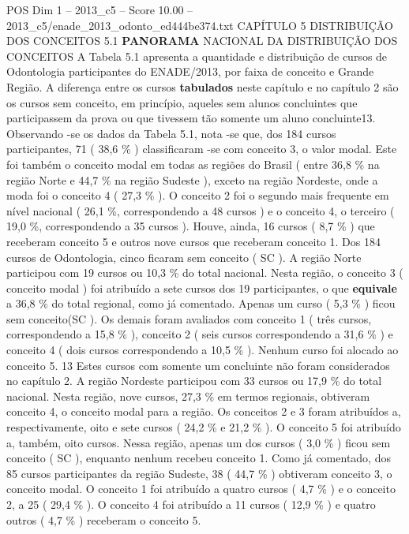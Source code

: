 \begin{textsample}{POS Dim 1 – 2013\_c5 – Score 10.00 – 2013\_c5/enade\_2013\_odonto\_ed444be374.txt}  \label{ex:f1_pos_083}
CAPÍTULO 5 DISTRIBUIÇÃO DOS CONCEITOS 5.1 \textbf{PANORAMA} NACIONAL DA DISTRIBUIÇÃO DOS CONCEITOS A Tabela 5.1 apresenta a quantidade e distribuição de cursos de Odontologia participantes do ENADE/2013, por faixa de conceito e Grande Região.
A diferença entre os cursos \textbf{tabulados} neste capítulo e no capítulo 2 são os cursos sem conceito, em princípio, aqueles sem alunos concluintes que participassem da prova ou que tivessem tão somente um aluno concluinte13.
Observando -se os dados da Tabela 5.1, nota -se que, dos 184 cursos participantes, 71 ( 38,6 \% ) classificaram -se com conceito 3, o valor modal.
Este foi também o conceito modal em todas as regiões do Brasil ( entre 36,8 \% na região Norte e 44,7 \% na região Sudeste ), exceto na região Nordeste, onde a moda foi o conceito 4 ( 27,3 \% ).
O conceito 2 foi o segundo mais frequente em nível nacional ( 26,1 \%, correspondendo a 48 cursos ) e o conceito 4, o terceiro ( 19,0 \%, correspondendo a 35 cursos ).
Houve, ainda, 16 cursos ( 8,7 \% ) que receberam conceito 5 e outros nove cursos que receberam conceito 1.
Dos 184 cursos de Odontologia, cinco ficaram sem conceito ( SC ).
A região Norte participou com 19 cursos ou 10,3 \% do total nacional.
Nesta região, o conceito 3 ( conceito modal ) foi atribuído a sete cursos dos 19 participantes, o que \textbf{equivale} a 36,8 \% do total regional, como já comentado.
Apenas um curso ( 5,3 \% ) ficou sem conceito(SC ).
Os demais foram avaliados com conceito 1 ( três cursos, correspondendo a 15,8 \% ), conceito 2 ( seis cursos correspondendo a 31,6 \% ) e conceito 4 ( dois cursos correspondendo a 10,5 \% ).
Nenhum curso foi alocado ao conceito 5. 13 Estes cursos com somente um concluinte não foram considerados no capítulo 2.
A região Nordeste participou com 33 cursos ou 17,9 \% do total nacional.
Nesta região, nove cursos, 27,3 \% em termos regionais, obtiveram conceito 4, o conceito modal para a região.
Os conceitos 2 e 3 foram atribuídos a, respectivamente, oito e sete cursos ( 24,2 \% e 21,2 \% ).
O conceito 5 foi atribuído a, também, oito cursos.
Nessa região, apenas um dos cursos ( 3,0 \% ) ficou sem conceito ( SC ), enquanto nenhum recebeu conceito 1.
Como já comentado, dos 85 cursos participantes da região Sudeste, 38 ( 44,7 \% ) obtiveram conceito 3, o conceito modal.
O conceito 1 foi atribuído a quatro cursos ( 4,7 \% ) e o conceito 2, a 25 ( 29,4 \% ).
O conceito 4 foi atribuído a 11 cursos ( 12,9 \% ) e quatro outros ( 4,7 \% ) receberam o conceito 5.

\end{textsample}
